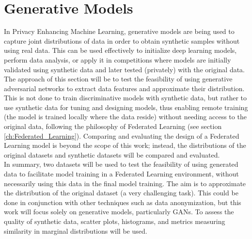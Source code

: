 \section{Generative Models}

In Privacy Enhancing Machine Learning, generative models are being used to capture joint distributions of data in order to obtain synthetic samples without using real data. This can be used effectively to initialize deep learning models, perform data analysis, or apply it in competitions where models are initially validated using synthetic data and later tested (privately) with the original data.\\
The approach of this section will be to test the feasibility of using generative adversarial networks to extract data features and approximate their distribution. This is not done to train discriminative models with synthetic data, but rather to use synthetic data for tuning and designing models, thus enabling remote training (the model is trained locally where the data reside) without needing access to the original data, following the philosophy of Federated Learning (see section \ref{ch:Federated_Learning}). Comparing and evaluating the design of a Federated Learning model is beyond the scope of this work; instead, the distributions of the original datasets and synthetic datasets will be compared and evaluated.\\
In summary, two datasets will be used to test the feasibility of using generated data to facilitate model training in a Federated Learning environment, without necessarily using this data in the final model training. The aim is to approximate the distribution of the original dataset (a very challenging task). This could be done in conjunction with other techniques such as data anonymization, but this work will focus solely on generative models, particularly GANs. To assess the quality of synthetic data, scatter plots, histograms, and metrics measuring similarity in marginal distributions will be used.\\
